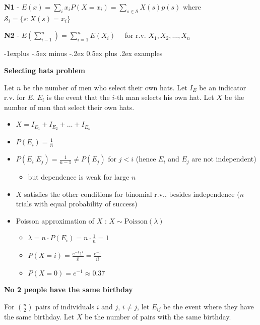 \documentclass[10pt, landscape]{article}
\makeatletter
\renewcommand{\subsection}{\@startsection{subsection}{2}{0mm}%
  {-1explus -.5ex minus -.2ex}%
  {0.5ex plus .2ex}%
{\normalfont\normalsize\bfseries}}
\makeatother
\begin{document}
\begin{multicols*}{3}
  \textbf{N1} - $E(x) = \sum\limits_i x_i P(X=x_i) = \sum\limits_{s \in \mathcal{S}} X(s) p(s)$
  where $\mathcal{S}_i = \{s : X(s)=x_i\}$

  \textbf{N2} - $E (\sum\limits_{i-1}^n) = \sum\limits^n_{i=1}E(X_i) \quad$ for r.v. $X_1, X_2, \dots, X_n$

  \subsection{examples}

  \textbf{Selecting hats problem}

  Let $n$ be the number of men who select their own hats.
  Let $I_E$ be an indicator r.v. for $E$. 
  $E_i$ is the event that the $i$-th man selects his own hat.
  Let $X$ be the number of men that select their own hats.

  \begin{itemize}
    \item $X = I_{E_1} + I_{E_2} + \dots + I_{E_n}$
    \item $P(E_i) = \frac{1}{n}$
    \item $P(E_i \vert E_j) = \frac{1}{n-1} \neq P(E_j) $ for $j < i$ (hence $E_i$ and $E_j$ are not independent)
      \begin{itemize}
        \item but dependence is weak for large $n$
      \end{itemize}
    \item $X$ satisfies the other conditions for binomial r.v., besides independence ($n$ trials with equal probability of success)
    \item Poisson approximation of $X$ : $X \sim \text{Poisson}(\lambda)$
      \begin{itemize}
        \item $\lambda = n \cdot P(E_i) = n\cdot \frac{1}{n} = 1$
        \item $P(X=i) = \frac{e^{-1}1^i}{i!} = \frac{e^{-1}}{i!} $ 
        \item $P(X=0) = e^{-1} \approx 0.37$
      \end{itemize}
  \end{itemize}

  \textbf{No 2 people have the same birthday}

  For $\binom{n}{2}$ pairs of individuals $i$ and $j$, $i \neq j$, let $E_{ij}$ be the event where they have the same birthday. 
  Let $X$ be the number of pairs with the same birthday.


\end{multicols*}
\end{document}
